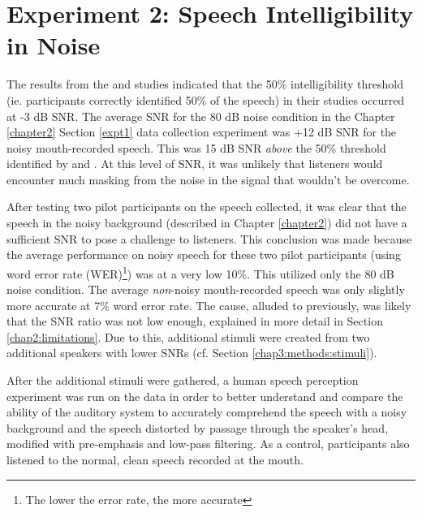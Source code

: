 


\section{Experiment 2: Speech Intelligibility in Noise}
\label{expt2}

The results from the \cite{ding:13} and \cite{gilbert:13} studies indicated that the 50\% intelligibility threshold (ie. participants correctly identified 50\% of the speech) in their studies occurred at -3 dB SNR.  The average SNR for the 80 dB noise condition in the Chapter \ref{chapter2} Section \ref{expt1} data collection experiment was +12 dB SNR for the noisy mouth-recorded speech.  This was 15 dB SNR \textit{above} the 50\% threshold identified by \cite{ding:13} and \cite{gilbert:13}.  At this level of SNR, it was unlikely that listeners would encounter much masking from the noise in the signal that wouldn't be overcome.

After testing two pilot participants on the speech collected, it was clear that the speech in the noisy background (described in Chapter \ref{chapter2}) did not have a sufficient SNR to pose a challenge to listeners.  This conclusion was made because the average performance on noisy speech for these two pilot participants (using word error rate (WER)\footnote{The lower the error rate, the more accurate}) was at a very low 10\%.  This utilized only the 80 dB noise condition.  The average \textit{non}-noisy mouth-recorded speech was only slightly more accurate at 7\% word error rate. The cause, alluded to previously, was likely that the SNR ratio was not low enough, explained in more detail in Section \ref{chap2:limitations}.  Due to this, additional stimuli were created from two additional speakers with lower SNRs (cf. Section \ref{chap3:methods:stimuli}).

After the additional stimuli were gathered, a human speech perception experiment was run on the data in order to better understand and compare the ability of the auditory system to accurately comprehend the speech with a noisy background and the speech distorted by passage through the speaker's head, modified with pre-emphasis and low-pass filtering.  As a control, participants also listened to the normal, clean speech recorded at the mouth.

